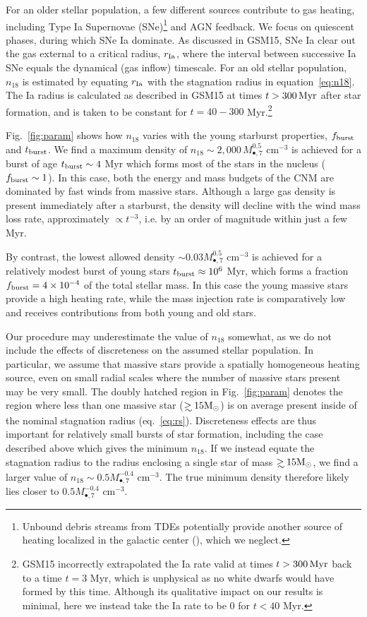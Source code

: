 \documentclass[usenatbib,fleqn]{mnras}
\newcommand\gsim{\mathrel{\rlap{\lower4pt\hbox{\hskip1pt$\sim$}}
    \raise1pt\hbox{$>$}}}
\newcommand{\Mbh}[1][]{M_{\bullet#1}}
\newcommand{\Msun}{{\rm M_\odot}}
\begin{document}
For an older stellar population, a few different sources contribute to
gas heating, including Type Ia Supernovae (SNe)\footnote{Unbound
  debris streams from TDEs potentially provide another source of
  heating localized in the galactic center
  (\citealt{Guillochon+2015a}), which we neglect.} and AGN feedback.
We focus on quiescent phases, during which SNe Ia dominate.  As
discussed in GSM15, SNe Ia clear out the gas external to a critical
radius, $r_{\rm Ia}$, where the interval between successive Ia SNe
equals the dynamical (gas inflow) timescale.  For an old stellar
population, $n_{18}$ is estimated by equating $r_{\rm Ia}$ with the
stagnation radius in equation~\eqref{eq:n18}.  The
Ia radius is calculated as described in GSM15 at times $t>300 \,{\rm
  Myr}$ after star formation, and is taken to be constant for $t =
40-300$ Myr.\footnote{GSM15 incorrectly extrapolated the Ia rate valid
  at times $t>300 \,{\rm Myr}$ back to a time $t = 3$ Myr, which is
  unphysical as no white dwarfs would have formed by this time.
  Although its qualitative impact on our results is minimal, here we
  instead take the Ia rate to be 0 for $ t < 40$ Myr.}


Fig.~\ref{fig:param} shows how $n_{18}$ varies with the young
starburst properties, $f_{\rm burst}$ and $t_{\rm burst}$.  We find a
maximum density of $n_{18} \sim 2,000\, \Mbh[,7]^{0.5}$ cm$^{-3}$ is
achieved for a burst of age $t_{\rm burst} \sim 4$ Myr which forms
most of the stars in the nucleus ($f_{\rm burst} \sim 1$).  In this
case, both the energy and mass budgets of the CNM are dominated by
fast winds from massive stars.  Although a large gas density is
present immediately after a starburst, the density will decline with
the wind mass loss rate, approximately $\propto t^{-3}$, i.e. by an
order of magnitude within just a few Myr.


By contrast, the lowest allowed density $\sim 0.03 \Mbh[,7]^{0.5}$
cm$^{-3}$ is achieved for a relatively modest burst of young stars
$t_{\rm burst} \approx 10^{6}$ Myr, which forms a fraction $f_{\rm
  burst} = 4\times 10^{-4}$ of the total stellar mass. In this case
the young massive stars provide a high heating rate, while the mass
injection rate is comparatively low and receives contributions from
both young and old stars.

Our procedure may underestimate the value of $n_{18}$ somewhat, as we
do not include the effects of discreteness on the assumed stellar
population.  In particular, we assume that massive stars provide a
spatially homogeneous heating source, even on small radial scales
where the number of massive stars present may be very small.  The
doubly hatched region in Fig.~\ref{fig:param} denotes the region where
less than one massive star ($\gsim 15 \Msun$) is on average present
inside of the nominal stagnation radius (eq.~\ref{eq:rs}).
Discreteness effects are thus important for relatively small bursts of
star formation, including the case described above which gives the
minimum $n_{18}$.  If we instead equate the stagnation radius to the
radius enclosing a single star of mass $\gsim 15 \Msun$, we find a
larger value of $n_{18}\sim 0.5 \Mbh[,7]^{-0.4}$ cm$^{-3}$.  The true
minimum density therefore likely lies closer to $0.5 \Mbh[,7]^{-0.4}$
cm$^{-3}$.
\end{document}

